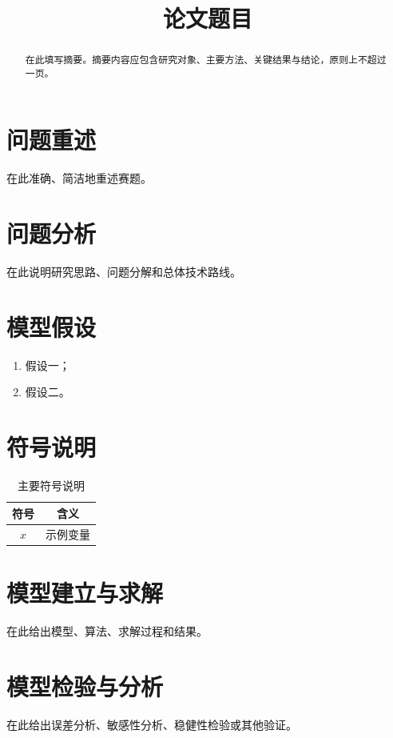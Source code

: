 \documentclass{cumcmthesis}
\title{论文题目}
\begin{document}
\maketitle

\begin{abstract}
在此填写摘要。摘要内容应包含研究对象、主要方法、关键结果与结论，原则上不超过一页。

\end{abstract}


\section{问题重述}
在此准确、简洁地重述赛题。

\section{问题分析}
在此说明研究思路、问题分解和总体技术路线。

\section{模型假设}
\begin{enumerate}
    \item 假设一；
    \item 假设二。
\end{enumerate}

\section{符号说明}
\begin{table}[H]
    \centering
    \caption{主要符号说明}
    \begin{tabular}{cc}
        \toprule[0.8pt]
        符号 & 含义 \\
        \midrule[0.5pt]
        $x$ & 示例变量 \\
        \bottomrule[0.8pt]
    \end{tabular}
\end{table}

\section{模型建立与求解}
在此给出模型、算法、求解过程和结果。

\section{模型检验与分析}
在此给出误差分析、敏感性分析、稳健性检验或其他验证。
\end{document}
